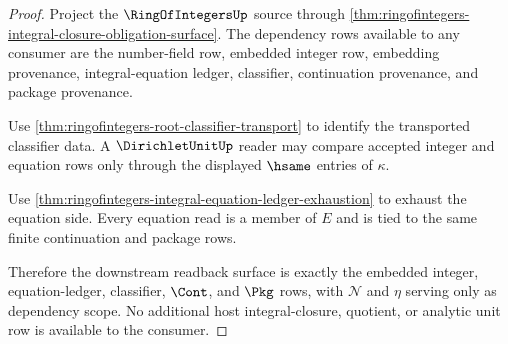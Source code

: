\begin{proof}
Project the $\RingOfIntegersUp$ source through
\autoref{thm:ringofintegers-integral-closure-obligation-surface}. The
dependency rows available to any consumer are the number-field row, embedded
integer row, embedding provenance, integral-equation ledger, classifier,
continuation provenance, and package provenance.

Use \autoref{thm:ringofintegers-root-classifier-transport} to identify the
transported classifier data. A $\DirichletUnitUp$ reader may compare accepted
integer and equation rows only through the displayed $\hsame$ entries of
$\kappa$.

Use \autoref{thm:ringofintegers-integral-equation-ledger-exhaustion} to exhaust
the equation side. Every equation read is a member of $E$ and is tied to the
same finite continuation and package rows.

Therefore the downstream readback surface is exactly the embedded integer,
equation-ledger, classifier, $\Cont$, and $\Pkg$ rows, with $\mathcal N$ and
$\eta$ serving only as dependency scope. No additional host integral-closure,
quotient, or analytic unit row is available to the consumer.
\end{proof}

